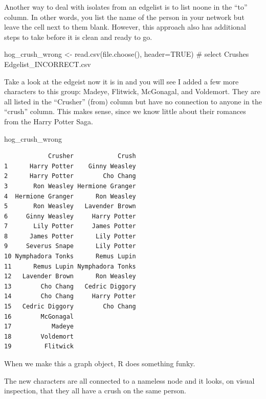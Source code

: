 \documentclass[
  letterpaper,
  DIV=11,
  numbers=noendperiod]{scrreprt}
\newenvironment{Shaded}{\begin{snugshade}}{\end{snugshade}}
\newcommand{\AttributeTok}[1]{\textcolor[rgb]{0.40,0.45,0.13}{#1}}
\newcommand{\CommentTok}[1]{\textcolor[rgb]{0.37,0.37,0.37}{#1}}
\newcommand{\ConstantTok}[1]{\textcolor[rgb]{0.56,0.35,0.01}{#1}}
\newcommand{\FunctionTok}[1]{\textcolor[rgb]{0.28,0.35,0.67}{#1}}
\newcommand{\NormalTok}[1]{\textcolor[rgb]{0.00,0.23,0.31}{#1}}
\newcommand{\OtherTok}[1]{\textcolor[rgb]{0.00,0.23,0.31}{#1}}
\begin{document}
Another way to deal with isolates from an edgelist is to list noone in
the ``to'' column. In other words, you list the name of the person in
your network but leave the cell next to them blank. However, this
approach also has additional steps to take before it is clean and ready
to go.

\begin{Shaded}
\begin{Highlighting}[]
\NormalTok{hog\_crush\_wrong }\OtherTok{\textless{}{-}} \FunctionTok{read.csv}\NormalTok{(}\FunctionTok{file.choose}\NormalTok{(), }\AttributeTok{header=}\ConstantTok{TRUE}\NormalTok{) }\CommentTok{\# select Crushes Edgelist\_INCORRECT.csv}
\end{Highlighting}
\end{Shaded}

Take a look at the edgeist now it is in and you will see I added a few
more characters to this group: Madeye, Flitwick, McGonagal, and
Voldemort. They are all listed in the ``Crusher'' (from) column but have
no connection to anyone in the ``crush'' column. This makes sense, since
we know little about their romances from the Harry Potter Saga.

\begin{Shaded}
\begin{Highlighting}[]
\NormalTok{hog\_crush\_wrong}
\end{Highlighting}
\end{Shaded}

\begin{verbatim}
            Crusher            Crush
1      Harry Potter    Ginny Weasley
2      Harry Potter        Cho Chang
3       Ron Weasley Hermione Granger
4  Hermione Granger      Ron Weasley
5       Ron Weasley   Lavender Brown
6     Ginny Weasley     Harry Potter
7       Lily Potter     James Potter
8      James Potter      Lily Potter
9     Severus Snape      Lily Potter
10 Nymphadora Tonks      Remus Lupin
11      Remus Lupin Nymphadora Tonks
12   Lavender Brown      Ron Weasley
13        Cho Chang   Cedric Diggory
14        Cho Chang     Harry Potter
15   Cedric Diggory        Cho Chang
16        McGonagal                 
17           Madeye                 
18        Voldemort                 
19         Flitwick                 
\end{verbatim}

When we make this a graph object, R does something funky.

The new characters are all connected to a nameless node and it looks, on
visual inspection, that they all have a crush on the same person.
\end{document}
